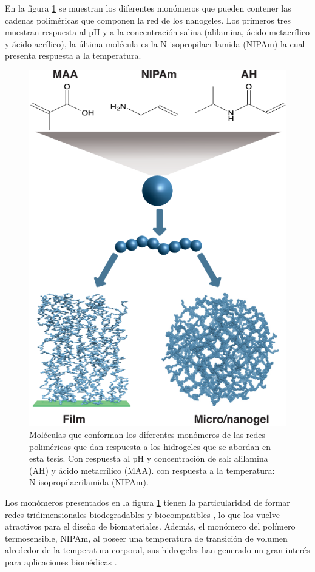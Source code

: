 En la figura \ref{fig:intro:acidos-aa-maa} se muestran los diferentes mon\'omeros que pueden contener las cadenas polim\'ericas que componen la red de los nanogeles. Los primeros tres muestran respuesta al pH y a la concentraci\'on salina (alilamina, \'acido metacr\'ilico y \'acido acr\'ilico), la \'ultima mol\'ecula es la N-isopropilacrilamida (NIPAm) la cual presenta respuesta a la temperatura.


\begin{figure}[!tb]
	\centering
	\includegraphics[width=0.75\linewidth]{Figures/modelos/hidrogeles.pdf}
	\caption{Mol\'eculas  que conforman los diferentes mon\'omeros de las redes polim\'ericas que dan respuesta a los hidrogeles que se abordan en esta tesis. Con respuesta al pH y concentraci\'on de sal: alilamina (AH) y  \'acido metacr\'ilico (MAA). con respuesta a la temperatura: N-isopropilacrilamida (NIPAm).}
	\label{fig:intro:acidos-aa-maa}
\end{figure}

Los mon\'omeros presentados en la figura \ref{fig:intro:acidos-aa-maa} tienen la particularidad de formar redes tridimensionales biodegradables y biocompatibles \cite{bajpai2008responsive}, lo que los vuelve atractivos para el dise\~no de biomateriales.
Adem\'as, el mon\'omero del pol\'imero termosensible, NIPAm, al poseer una temperatura de transici\'on de volumen alrededor de la temperatura corporal, sus hidrogeles han generado un gran inter\'es para aplicaciones biom\'edicas \cite{Guan2011}.

